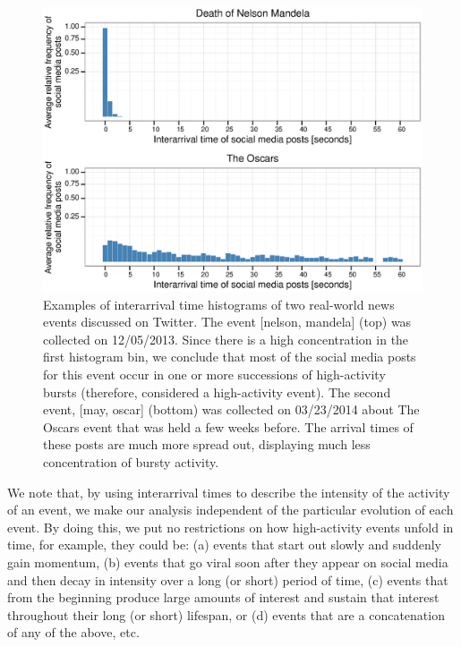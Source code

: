 \begin{figure}[!htb]
  \centering
    \includegraphics[width=\textwidth]{PLOSONE/figures/plots_revision/fig1}
  \caption[Examples of interarrival time histograms]{{Examples of interarrival time histograms of two real-world news
events discussed on Twitter. The event [nelson, mandela] (top) was
      collected on 12/05/2013. Since there is a high
      concentration in the first histogram bin, we conclude that most of the social media posts
      for this event occur in one or more successions of high-activity
      bursts (therefore, considered a high-activity event).
      The second event, [may, oscar] (bottom) was collected
      on 03/23/2014 about The Oscars event that was held a few
      weeks before. The arrival times of these posts are much more spread
      out, displaying much less concentration of bursty activity.} 
  }
  \label{fig:fig1}
\end{figure}


We note that, by using interarrival times to describe the intensity of the
activity of an event, we make our analysis independent of the particular
evolution of each event. By doing this, we put no restrictions on how
high-activity events unfold in time, for example, they could be: (a) events
that start out slowly and
suddenly gain momentum, (b) events that go viral soon after they appear on
social media and then decay in intensity over a long (or short) period of
time, (c) events that from the beginning produce large amounts of interest and
sustain that interest throughout their long (or short) lifespan, or (d)
events that are a concatenation of any of the above, etc.

